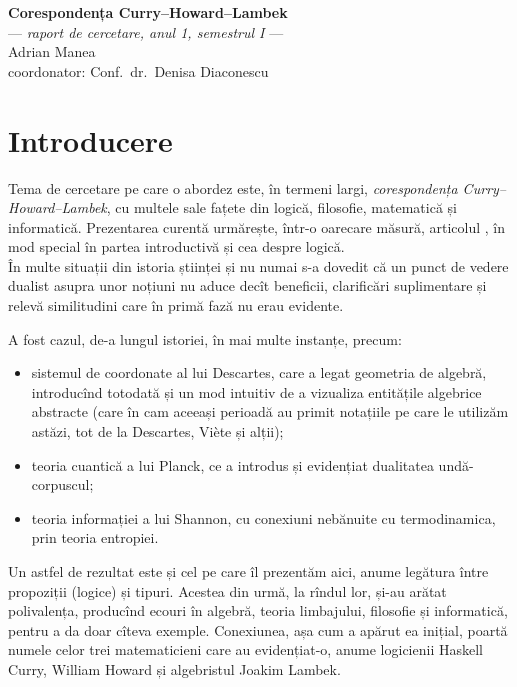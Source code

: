 \documentclass[a4paper]{article}
\begin{document}
\begin{center}
  {{\Large\textbf{Corespondența Curry--Howard--Lambek}} \\
    --- \textit{raport de cercetare, anul 1, semestrul I} --- \\
    Adrian Manea \\
    coordonator: Conf.\ dr.\ Denisa Diaconescu
  }
\end{center}

\vspace{2cm}

\tableofcontents


\section{Introducere}

\indent\indent Tema de cercetare pe care o abordez este, în termeni
largi, \emph{corespondența Curry--Howard--Lambek}, cu mul\-te\-le sale fațete
din logică, filosofie, matematică și informatică. Prezentarea curentă
urmărește, într-o oarecare măsură, articolul \cite{wad}, în mod special în
partea introductivă și cea despre logică. \\


În multe situații din istoria științei și nu numai s-a dovedit că un punct de
vedere dualist asupra unor noțiuni nu aduce decît beneficii, clarificări
suplimentare și relevă similitudini care în primă fază nu erau evidente.

A fost cazul, de-a lungul istoriei, în mai multe instanțe, precum:
\begin{itemize}
  \item sistemul de coordonate al lui Descartes, care a legat geometria de
    algebră, introducînd totodată și un mod intuitiv de a vizualiza entitățile
    algebrice abstracte (care în cam aceeași perioadă au primit notațiile
    pe care le utilizăm astăzi, tot de la Descartes, Vi\`{e}te și alții);
  \item teoria cuantică a lui Planck, ce a introdus și evidențiat dualitatea undă-corpuscul;
  \item teoria informației a lui Shannon, cu conexiuni nebănuite
    cu termodinamica, prin teoria entropiei.
\end{itemize}

Un astfel de rezultat este și cel pe care îl prezentăm aici, anume legătura
între propoziții (logice) și tipuri. Acestea din urmă, la rîndul lor, și-au
arătat polivalența, producînd ecouri în algebră, teoria limbajului, filosofie
și informatică, pentru a da doar cîteva exemple. Conexiunea, așa cum a apărut
ea inițial, poartă numele celor trei matematicieni care au evidențiat-o,
anume logicienii Haskell Curry, William Howard și algebristul Joakim Lambek.
\end{document}
